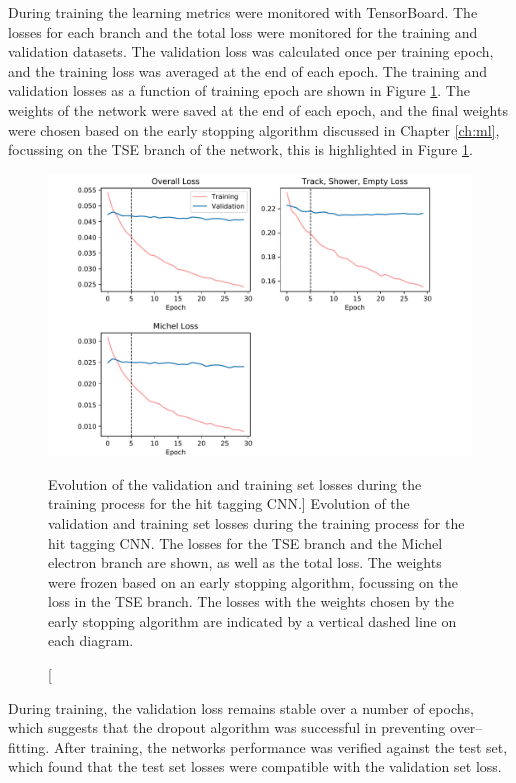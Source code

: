 During training the learning metrics were monitored with TensorBoard. The
losses for each branch and the total loss were monitored for the training
and validation datasets. The validation loss was calculated once per training
epoch, and the training loss was averaged at the end of each epoch. The 
training and validation losses as a function of training epoch are shown in 
Figure \ref{fig:training}.  The weights of the network were saved at the end 
of each epoch, and the final weights were chosen based on the early stopping 
algorithm discussed in Chapter \ref{ch:ml}, focussing on the TSE branch of the 
network, this is highlighted in Figure \ref{fig:training}.
\begin{figure}
	\centering
	\includegraphics[width=\textwidth]{figures/losses_prelu.pdf}
	\caption
	[Evolution of the validation and training set losses during the training 
	process for the hit tagging CNN.]
	{Evolution of the validation and training set losses during the training 
	process for the hit tagging CNN. The losses for the TSE branch and the Michel 
	electron branch are shown, as well as the total loss. The weights were frozen 
	based on an early stopping algorithm, focussing on the loss in the TSE 
	branch. The losses with the weights chosen by the early stopping algorithm 
	are indicated by a vertical dashed line on each diagram.} 
	\label{fig:training}
\end{figure}

During training, the validation loss remains stable over a number of epochs,
which suggests that the dropout algorithm was successful in preventing 
over--fitting. After training, the networks performance was verified against 
the test set, which found that the test set losses were compatible with the 
validation set loss. 

